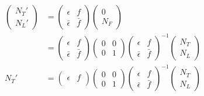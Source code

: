 \begin{align}
\begin{split}
\left( \begin{array}{c}
N_T' \\
N_L'
\end{array} \right)
&=
\left( \begin{array}{cc}
\epsilon & f \\
\bar{\epsilon} & \bar{f}
\end{array} \right)
\left( \begin{array}{c}
0 \\
N_F
\end{array} \right) \\
&=
\left( \begin{array}{cc}
\epsilon & f \\
\bar{\epsilon} & \bar{f}
\end{array} \right)
\left( \begin{array}{cc}
0 & 0 \\
0 & 1
\end{array} \right)
\left( \begin{array}{cc}
\epsilon & f \\
\bar{\epsilon} & \bar{f}
\end{array} \right)^{-1}
\left( \begin{array}{c}
N_T \\
N_L
\end{array} \right) \\
N_T'
&=
\left( \begin{array}{cc}
\epsilon & f \\
\end{array} \right)
\left( \begin{array}{cc}
0 & 0 \\
0 & 1
\end{array} \right)
\left( \begin{array}{cc}
\epsilon & f \\
\bar{\epsilon} & \bar{f}
\end{array} \right)^{-1}
\left( \begin{array}{c}
N_T \\
N_L
\end{array} \right) \\
\end{split}
\end{align}

